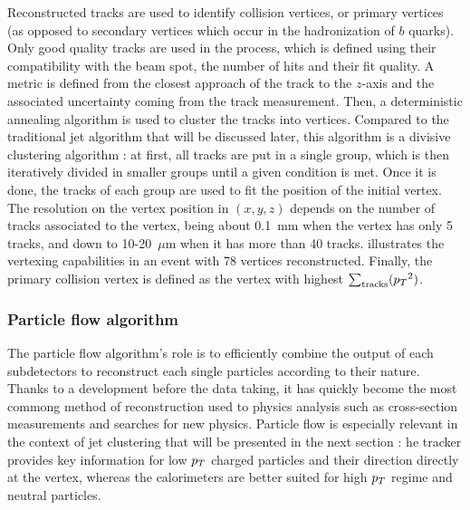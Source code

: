         Reconstructed tracks are used to identify collision vertices, or primary vertices
        (as opposed to secondary vertices which occur in the hadronization of $b$ quarks).
        Only good quality tracks are used in the process, which is defined using their
        compatibility with the beam spot, the number of hits and their fit quality. A
        metric is defined from the closest approach of the track to the $z$-axis and
        the associated uncertainty coming from the track measurement. Then, a deterministic
        annealing algorithm is used to cluster the tracks into vertices. Compared to the
        traditional jet algorithm that will be discussed later, this algorithm is a divisive
        clustering algorithm : at first, all tracks are put in a single group, which is then
        iteratively divided in smaller groups until a given condition is met. Once it is
        done, the tracks of each group are used to fit the position of the initial vertex.
        The resolution on the vertex position in $(x,y,z)$ depends on the number of tracks
        associated to the vertex, being about 0.1~mm when the vertex has only 5 tracks, and
        down to 10-20~$\mu$m when it has more than 40 tracks. 
        illustrates the vertexing capabilities in an event with 78 vertices reconstructed.
        Finally, the primary collision vertex is defined as the vertex with highest
        $\sum_\text{tracks} ({p_T}^2)$.


            \subsubsection{Particle flow algorithm}



        The particle flow algorithm's role is to efficiently combine the output of each
        subdetectors to reconstruct each single particles according to their nature. Thanks
        to a development before the data taking, it has quickly become the most commong
        method of reconstruction used to physics analysis such as cross-section measurements
        and searches for new physics. Particle flow is especially relevant in the context
        of jet clustering that will be presented in the next section : he tracker provides
        key information for low $p_T$ charged particles and their direction directly at the
        vertex, whereas the calorimeters are better suited for high $p_T$ regime and neutral
        particles.

